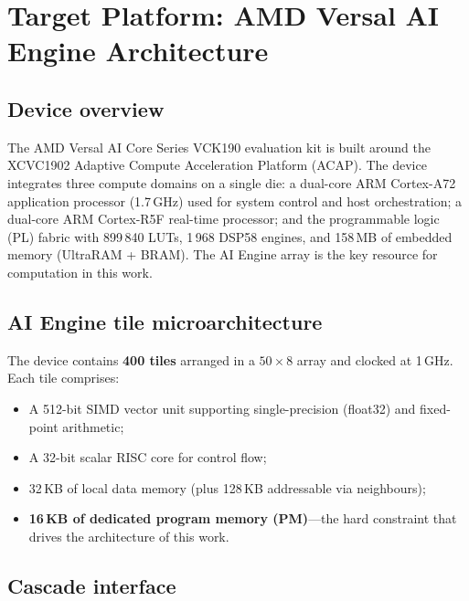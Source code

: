 
\section{Target Platform: AMD Versal AI Engine Architecture}\label{sec:platform}

\subsection{Device overview}

The AMD Versal AI Core Series VCK190 evaluation kit is built around the
XCVC1902 Adaptive Compute Acceleration Platform (ACAP).  The device integrates
three compute domains on a single die: a dual-core ARM Cortex-A72 application
processor (1.7\,GHz) used for system control and host orchestration; a
dual-core ARM Cortex-R5F real-time processor; and the programmable logic (PL)
fabric with 899\,840 LUTs, 1\,968 DSP58 engines, and 158\,MB of embedded
memory (UltraRAM + BRAM).  The AI Engine array is the key resource for
computation in this work.

\subsection{AI Engine tile microarchitecture}\label{sec:aie_tile}

The device contains \textbf{400 \aie tiles} arranged in a $50\times 8$ array
and clocked at 1\,GHz.  Each tile comprises:
\begin{itemize}
  \item A 512-bit SIMD vector unit supporting single-precision (float32) and
    fixed-point arithmetic;
  \item A 32-bit scalar RISC core for control flow;
  \item 32\,KB of local data memory (plus 128\,KB addressable via neighbours);
  \item \textbf{16\,KB of dedicated program memory (PM)}---the hard constraint
    that drives the architecture of this work.
\end{itemize}

\subsection{Cascade interface}\label{sec:cascade}

